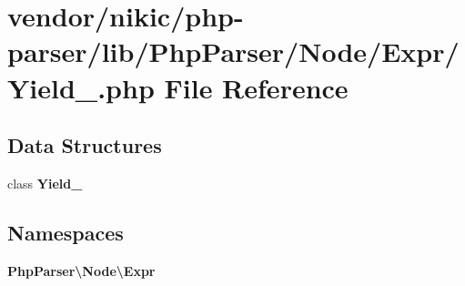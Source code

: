 \section{vendor/nikic/php-\/parser/lib/\+Php\+Parser/\+Node/\+Expr/\+Yield\+\_\+.php File Reference}
\label{_yield___8php}
\subsection*{Data Structures}
\begin{DoxyCompactItemize}
\item 
class {\bf Yield\+\_\+}
\end{DoxyCompactItemize}
\subsection*{Namespaces}
\begin{DoxyCompactItemize}
\item 
 {\bf Php\+Parser\textbackslash{}\+Node\textbackslash{}\+Expr}
\end{DoxyCompactItemize}
